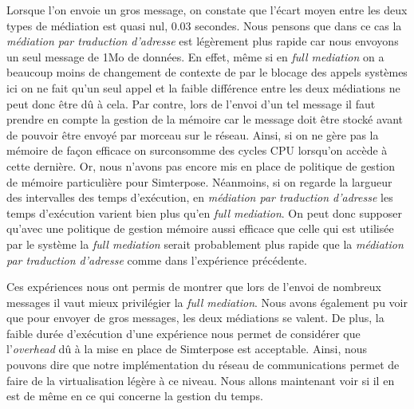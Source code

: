 Lorsque l'on envoie un gros message, on constate que l'écart moyen entre les deux types de médiation est quasi nul, 0.03 secondes. Nous pensons que dans ce cas la \textit{médiation par traduction d'adresse} est légèrement plus rapide car nous envoyons un seul message de 1Mo de données. En effet, même si en \textit{full mediation} on a beaucoup moins de changement de contexte de par le blocage des appels systèmes ici on ne fait qu'un seul appel et la faible différence entre les deux médiations ne peut donc être dû à cela. Par contre, lors de l'envoi d'un tel message il faut prendre en compte la gestion de la mémoire car le message doit être stocké avant de pouvoir être envoyé par morceau sur le réseau. Ainsi, si on ne gère pas la mémoire de façon efficace on surconsomme des cycles CPU lorsqu'on accède à cette dernière. Or, nous n'avons pas encore mis en place de politique de gestion de mémoire particulière pour Simterpose. Néanmoins, si on regarde la largueur des intervalles des temps d'exécution, en \textit{médiation par traduction d'adresse} les temps d'exécution varient bien plus qu'en \textit{full mediation}. On peut donc supposer qu'avec une politique de gestion mémoire aussi efficace que celle qui est utilisée par le système la \textit{full mediation} serait probablement plus rapide que la \textit{médiation par traduction d'adresse} comme dans l'expérience précédente.

Ces expériences nous ont permis de montrer que lors de l'envoi de nombreux messages il vaut mieux privilégier la \textit{full mediation}. Nous avons également pu voir que pour envoyer de gros messages, les deux médiations se valent. De plus, la faible durée d'exécution d'une expérience nous permet de considérer que l'\textit{overhead} dû à la mise en place de Simterpose est acceptable. Ainsi, nous pouvons dire que notre implémentation du réseau de communications permet de faire de la virtualisation légère à ce niveau. Nous allons maintenant voir si il en est de même en ce qui concerne la gestion du temps.

